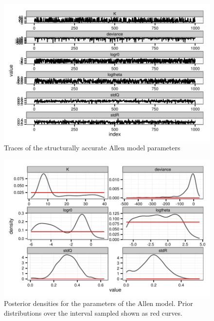 \documentclass[author-year, review]{elsarticle} %
\makeatletter
\def\maxwidth{\ifdim\Gin@nat@width>\linewidth\linewidth
\else\Gin@nat@width\fi}
\let\Oldincludegraphics\includegraphics
\renewcommand{\includegraphics}[1]{\Oldincludegraphics[width=\maxwidth]{#1}}
\makeatother
\begin{document}
\begin{figure}[htbp]
\centering
\includegraphics{parametric_bayes_traces.pdf}
\caption{Traces of the structurally accurate Allen model parameters}
\end{figure}

\begin{figure}[htbp]
\centering
\includegraphics{parametric_bayes_posteriors.pdf}
\caption{Posterior densities for the parameters of the Allen model.
Prior distributions over the interval sampled shown as red curves.}
\end{figure}
\end{document}
